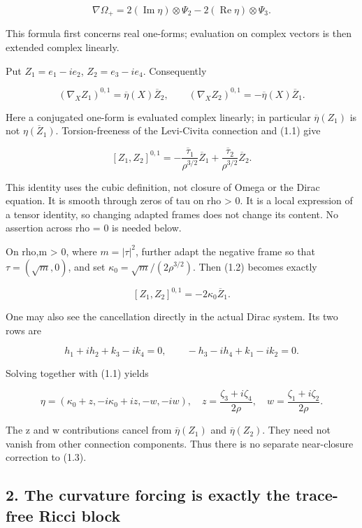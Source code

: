 \documentclass[
  10pt,
]{article}
\begin{document}
\[
 \nabla\Omega_+=2(\operatorname{Im}\eta)\otimes\Psi_2
                         -2(\operatorname{Re}\eta)\otimes\Psi_3.
\]

This formula first concerns real one-forms; evaluation on complex
vectors is then extended complex linearly.

Put \(Z_1=e_1-ie_2\), \(Z_2=e_3-ie_4\). Consequently

\[
 (\nabla_XZ_1)^{0,1}=\overline\eta(X)\overline Z_2,
 \qquad (\nabla_XZ_2)^{0,1}=-\overline\eta(X)\overline Z_1.
\]

Here a conjugated one-form is evaluated complex linearly; in particular
\(\overline\eta(Z_1)\) is not \(\overline{\eta(Z_1)}\). Torsion-freeness
of the Levi-Civita connection and (1.1) give

\[
 \boxed{[Z_1,Z_2]^{0,1}
  =-\frac{\overline\tau_1}{\rho^{3/2}}\overline Z_1
    +\frac{\overline\tau_2}{\rho^{3/2}}\overline Z_2.}      \tag{1.2}
\]

This identity uses the cubic definition, not closure of Omega or the
Dirac equation. It is smooth through zeros of tau on rho \textgreater{}
0. It is a local expression of a tensor identity, so changing adapted
frames does not change its content. No assertion across rho = 0 is
needed below.

On rho,m \textgreater{} 0, where \(m=|\tau|^2\), further adapt the
negative frame so that \(\tau=(\sqrt m,0)\), and set
\(\kappa_0=\sqrt m/(2\rho^{3/2})\). Then (1.2) becomes exactly

\[
                [Z_1,Z_2]^{0,1}=-2\kappa_0\overline Z_1.   \tag{1.3}
\]

One may also see the cancellation directly in the actual Dirac system.
Its two rows are

\[
 h_1+ih_2+k_3-ik_4=0,\qquad
 -h_3-ih_4+k_1-ik_2=0.
\]

Solving together with (1.1) yields

\[
 \eta=(\kappa_0+z,-i\kappa_0+iz,-w,-iw),\quad
 z=\frac{\zeta_3+i\zeta_4}{2\rho},\quad
 w=\frac{\zeta_1+i\zeta_2}{2\rho}.
\]

The z and w contributions cancel from \(\overline\eta(Z_1)\) and
\(\overline\eta(Z_2)\). They need not vanish from other connection
components. Thus there is no separate near-closure correction to (1.3).

\hypertarget{the-curvature-forcing-is-exactly-the-trace-free-ricci-block}{%
\subsection{2. The curvature forcing is exactly the trace-free Ricci
block}\label{the-curvature-forcing-is-exactly-the-trace-free-ricci-block}}
\end{document}
